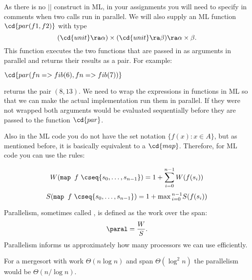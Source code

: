 \begin{cluster}
\label{grp:tch:analysis::models::construct}

\begin{teachnote}
\label{tch:analysis::models::construct}
As there is no $||$
construct in ML, in your assignments you will need to specify in comments when two calls run
in parallel.  We will also supply an ML function $\cd{par (f1,f2)}$ with
type 
\[
(\cd{unit} \ra \alpha) \times (\cd{unit} \ra \beta) \ra \alpha
\times \beta.
\]
This function executes the two functions that are passed in as
arguments in parallel and returns their results as a pair.  For
example:

$\cd{par (fn => fib(6), fn => fib(7))}$

returns the pair $(8,13)$.  We need to wrap the expressions in
functions in ML so that we can make the actual implementation run them
in parallel.  If they were not wrapped both arguments would be
evaluated sequentially before they are passed to the function
$\cd{par}$.  

Also in the ML code you do not have the set
notation $\{f(x) : x \in A\}$, but as mentioned before, it is
basically equivalent to a
$\cd{map}$.   Therefore, for ML code you can use the rules:

  \[ W(\mbox{\tt map } f\ \cseq{s_0, \ldots, s_{n-1}}) = 1 + \sum_{i=0}^{n-1} W(f(s_i)) \]
   \[S(\mbox{\tt map } f\ \cseq{s_0, \ldots, s_{n-1}}) = 1 + \max{}_{i=0}^{n-1} S(f(s_i)) \]

\end{teachnote}
\end{cluster}

\begin{cluster}
\label{grp:def:analysis::models::average-parallelism}

\begin{definition}
\label{def:analysis::models::average-parallelism}
Parallelism, sometimes called , is
defined as the work over the span:
\[ 
\paral = \frac{W}{S}.
\]
Parallelism informs us approximately how many processors we can use
efficiently.

\end{definition}
\end{cluster}

\begin{cluster}
\label{grp:xmpl:analysis::models::mergesort}

\begin{example}
\label{xmpl:analysis::models::mergesort}
For a mergesort with work $\Theta(n \log n)$ and span
$\Theta(\log^2 n)$ the parallelism would be $\Theta(n/\log
n)$.

\end{example}
\end{cluster}

